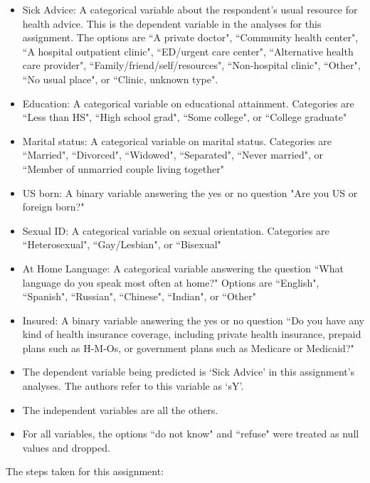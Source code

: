 \documentclass[10pt,twocolumn]{article}
\begin{document}
\begin{itemize}
\item Sick Advice: A categorical variable about the respondent's usual resource for
health advice. This is the dependent variable in the analyses for this
assignment. The options are
``A private doctor",
``Community health center",
``A hospital outpatient clinic",
``ED/urgent care center",
``Alternative health care provider",
``Family/friend/self/resources",
``Non-hospital clinic",
``Other",
``No usual place", or
``Clinic, unknown type".
\item Education: A categorical variable on educational attainment. Categories are ``Less than HS", ``High school grad",
``Some college", or ``College graduate"
\item Marital status: A categorical variable on marital status. Categories are
``Married",
``Divorced",
``Widowed",
``Separated",
``Never married", or
``Member of unmarried couple living together"
\item US born: A binary variable answering the yes or no question "Are you US or foreign born?"
\item Sexual ID: A categorical variable on sexual orientation. Categories are
``Heterosexual",
``Gay/Lesbian", or
``Bisexual"
\item At Home Language: A categorical variable answering the question ``What language do you
speak most often at
home?" Options are
``English",
``Spanish",
``Russian",
``Chinese",
``Indian", or
``Other"
\item Insured: A binary variable answering the yes or no question ``Do you have any
kind of health
insurance coverage,
including private
health insurance,
prepaid plans such as
H-M-Os, or
government plans
such as Medicare or
Medicaid?"
\item The dependent variable being predicted is `Sick Advice' in this assignment's
analyses. The authors refer to this variable as `sY'.
\item The independent variables are all the others.
\item  For all variables, the options ``do not know" and ``refuse"
were treated as null values and dropped.
\end{itemize}


The steps taken for this assignment:
\end{document}
